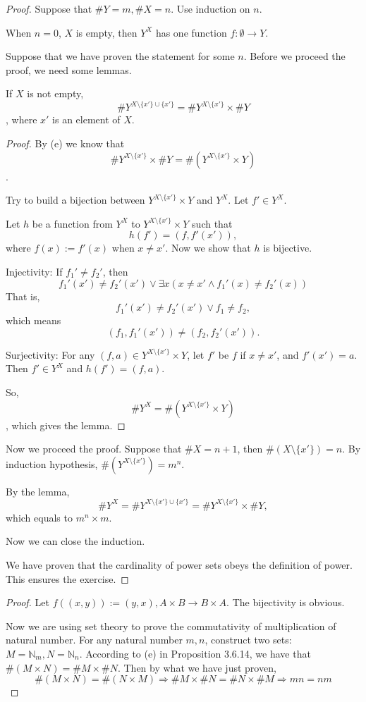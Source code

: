\begin{proof}
Suppose that $\#Y = m,\#X = n$. Use induction on $n$. 

When $n=0$, $X$ is empty, then $Y^X$ has one function $f:\emptyset \rightarrow Y$.

Suppose that we have proven the statement for some $n$. Before we proceed the proof, we need some lemmas.
\begin{lem}
If $X$ is not empty, 
\[
\#Y^{X\setminus\{x'\}\cup\{x'\}} = \#Y^{X\setminus\{x'\}} \times \#Y
\], 
where $x'$ is an element of $X$.
\end{lem}
\begin{proof}
By (e) we know that 
\[
\#Y^{X\setminus\{x'\}} \times \#Y = \#(Y^{X\setminus\{x'\}} \times Y)
\].

Try to build a bijection between $Y^{X\setminus\{x'\}} \times Y$ and $Y^X$. Let $f' \in Y^X$.

Let $h$ be a function from $Y^X$ to $Y^{X\setminus\{x'\}} \times Y$ such that
\[
h(f') = (f,f'(x')), 
\]
where $f(x):=f'(x)$ when $x \neq x'$. Now we show that $h$ is bijective.

Injectivity: 
If ${f_1}' \neq {f_2}'$, then 
\[
{f_1}'(x') \neq {f_2}'(x') \vee \exists x(x \neq x' \wedge {f_1}'(x) \neq {f_2}'(x))
\]
That is, 
\[
{f_1}'(x') \neq {f_2}'(x') \vee f_1 \neq f_2,
\]
which means 
\[
(f_1,{f_1}'(x')) \neq (f_2,{f_2}'(x')).
\]

Surjectivity:
For any $(f,a) \in Y^{X\setminus\{x'\}} \times Y$, let $f'$ be $f$ if $x\neq x'$, and $f'(x') = a$. Then 
$f' \in Y^X$ and $h(f') = (f,a)$.

So, 
\[
\#Y^X = \#(Y^{X\setminus\{x'\}} \times Y)
\], which gives the lemma.
\end{proof}

Now we proceed the proof. Suppose that $\#X = n+1$, then $\#(X \setminus\{x'\}) = n$. By induction 
hypothesis, $\#(Y^{X \setminus\{x'\}}) = m^n$. 

By the lemma, 
\[
\#Y^X = \#Y^{X\setminus\{x'\}\cup\{x'\}} = \#Y^{X\setminus\{x'\}} \times \#Y,
\]
which equals to $m^n \times m$.

Now we can close the induction.

We have proven that the cardinality of power sets obeys the definition of power. This ensures the 
exercise.
\end{proof}

\begin{proof}
Let $f((x,y)):= (y,x), A\times B \rightarrow B \times A$. The bijectivity is obvious. 

Now we are using set theory to prove the commutativity of multiplication of natural number. For any 
natural number $m,n$, construct two sets: $M = \mathbb{N}_{m}, N = \mathbb{N}_{n}$. According to (e) in 
Proposition 3.6.14, we have that $\#(M \times N) = \#M \times \#N$. Then by what we have just proven, 
\[
\#(M \times N) = \#(N \times M) \Longrightarrow \#M \times \#N = \#N \times \#M \Longrightarrow mn = nm
\]
\end{proof}

